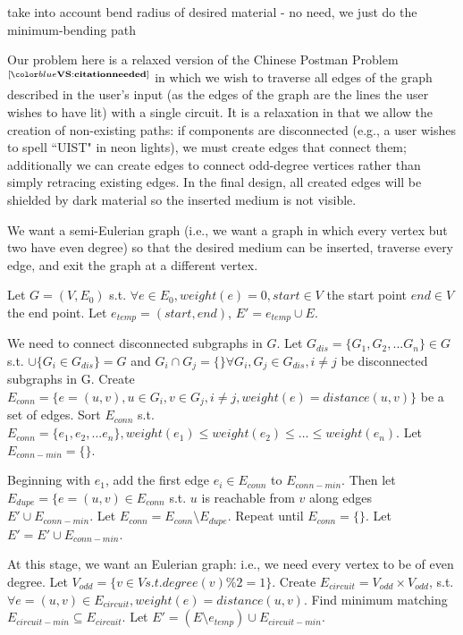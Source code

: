take into account bend radius of desired material - no need, we just do the minimum-bending path

Our problem here is a relaxed version of the Chinese Postman Problem$^{[\valkyrie{citation needed}]}$ in which we wish to traverse all edges of the graph described in the user's input (as the edges of the graph are the lines the user wishes to have lit) with a single circuit.  It is a relaxation in that we allow the creation of non-existing paths: if components are disconnected (e.g., a user wishes to spell ``UIST" in neon lights), we must create edges that connect them; additionally we can create edges to connect odd-degree vertices rather than simply retracing existing edges.  In the final design, all created edges will be shielded by dark material so the inserted medium is not visible.

We want a semi-Eulerian graph (i.e., we want a graph in which every vertex but two have even degree) so that the desired medium can be inserted, traverse every edge, and exit the graph at a different vertex.

Let $G=(V,E_0)$ s.t. $\forall e \in E_0, weight(e)=0, start \in V $ the start point $end \in V$ the end point.  Let $e_{temp} = (start, end)$, $E' = e_{temp} \cup E$.

We need to connect disconnected subgraphs in $G$.  Let $G_{dis} = \{G_1, G_2, ... G_n\} \in G$ s.t. $\cup{\{G_i \in G_{dis}\}} = G$ and $G_i \cap G_j  = \{ \} \forall G_i, G_j \in G_{dis}, i\neq j$ be disconnected subgraphs in G.  Create $E_{conn} = \{e = (u, v), u \in G_i, v \in G_j, i \neq j, weight(e) = distance(u, v)\}$ be a set of edges.  Sort $E_{conn}$ s.t. $E_{conn} = \{e_1, e_2, ... e_n\}, weight(e_1) \leq weight(e_2) \leq \ldots \leq weight(e_n)$.  Let $E_{conn-min} = \{ \}$.

Beginning with $e_1$, add the first edge $e_i \in E_{conn}$ to $E_{conn-min}$.  Then let $E_{dupe} = \{ e = (u, v) \in E_{conn}$ s.t. $u$  is reachable from $v$ along edges $E' \cup E_{conn-min}$.  Let $E_{conn} = E_{conn} \setminus E_{dupe}$.  Repeat until $E_{conn} = \{ \}$.  Let $E' = E' \cup E_{conn-min}$.

At this stage, we want an Eulerian graph: i.e., we need every vertex to be of even degree.  Let $V_{odd} = \{ v \in V s.t. degree(v) \% 2 = 1 \}$.  Create $E_{circuit} = V_{odd} \times V_{odd}$, s.t. $\forall e=(u,v) \in E_{circuit}, weight(e) = distance(u, v)$.  Find minimum matching $E_{circuit-min} \subseteq E_{circuit}$.  Let $E' = (E\setminus e_{temp}) \cup E_{circuit-min}$.

